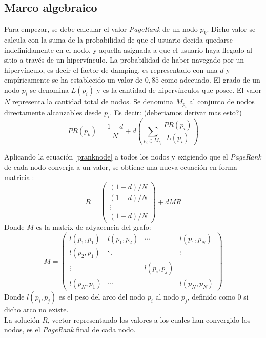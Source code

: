 \documentclass[%
    final,
    reprint,
    notitlepage,
    narroweqnarray,
    inline,
    twoside,
    invited
    ]{ieee}
\begin{document}
\subsection{Marco algebraico}
Para empezar, se debe calcular el valor \textit{PageRank} de un nodo $p_{k}$. Dicho valor se calcula con la suma de la probabilidad de que el usuario 
decida quedarse indefinidamente en el nodo, y aquella asignada a que el usuario haya llegado al sitio a través de un hipervínculo. La probabilidad 
de haber navegado por un hipervínculo, es decir el factor de damping, es representado con una $d$ y empíricamente se ha establecido un valor
de $0,85$ como adecuado. El grado de un nodo $p_{i}$ se denomina $L(p_{i})$ y es la cantidad de hipervínculos que posee. El valor $N$ representa 
la cantidad total de nodos. Se denomina $M_{p_{i}}$ al conjunto de nodos directamente alcanzables desde $p_{i}$. Es decir: (deberiamos derivar mas esto?)\\
\begin{equation}\label{pranknode}
PR(p_{k}) = \frac{1-d}{N} + d\left(\sum_{p_{i}\in M_{p_{i}}}\frac{PR(p_{i})}{L(p_{i})}\right)
\end{equation}
\par Aplicando la ecuación \eqref{pranknode} a todos los nodos y exigiendo que el \textit{PageRank} de cada nodo converja a un valor, 
se obtiene una nueva ecuación en forma matricial:
\begin{equation}\label{pranksolution}
R = \begin{pmatrix}
(1-d)/N \\ (1-d)/N \\ \vdots \\ (1-d)/N
\end{pmatrix} + dMR
\end{equation}
Donde $M$ es la matrix de adyacencia del grafo:
\begin{equation}\label{M}
M=\begin{pmatrix}
l(p_{1},p_{1}) & l(p_{1},p_{2}) & \cdots & l(p_{1},p_{N}) \\
l(p_{2},p_{1}) & \ddots & & \vdots \\
\vdots & & l(p_{i}, p_{j}) & \\
l(p_{N},p_{1}) & \cdots &  & l(p_{N},p_{N}) 
\end{pmatrix}
\end{equation}
Donde $l(p_{i},p_{j})$ es el peso del arco del nodo $p_{i}$ al nodo $p_{j}$, definido como $0$ si dicho arco no existe.\\
La solución $R$, vector representando los valores a los cuales han convergido los nodos, es el \textit{PageRank} final de cada nodo.
\end{document}
